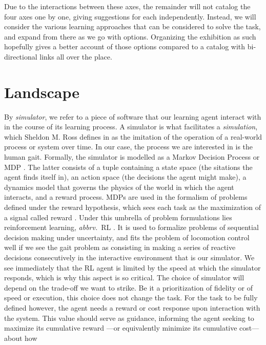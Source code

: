 \documentclass[12pt,a4paper]{article}
\begin{document}
Due to the interactions between these axes, the remainder will not catalog the four axes one by
one, giving suggestions for each independently. Instead, we will consider the various learning
approaches that can be considered to solve the task, and expand from there as we go with options.
Organizing the exhibition as such hopefully gives a better account of those options compared to
a catalog with bi-directional links all over the place.

\section{Landscape}
\label{s:landscape}

By \textit{simulator}, we refer to a piece of software that our learning agent interact with in
the course of its learning process. A simulator is what facilitates a \emph{simulation}, which
Sheldon M. Ross defines in \cite{Ross2022-ra} as the imitation of the operation of a real-world
process or system over time. In our case, the process we are interested in is the human gait.
Formally, the simulator is modelled as a Markov Decision Process or MDP \cite{Puterman1994-pf}.
The latter consists of a tuple containing a state space (the sitations the agent finds itself in),
an action space (the decisions the agent might make), a dynamics model that governs the physics of
the world in which the agent interacts, and a reward process. MDPs are used in the formalism of
problems defined under the reward hypothesis, which sees each task as the maximization of a signal
called reward \cite{Bowling2022-li, Silver2021-uj}. Under this umbrella of problem formulations
lies reinforcement learning, \textit{abbrv.}~RL \cite{Sutton1998-ow}. It is used to
formalize problems of sequential decision making under uncertainty, and fits the problem of
locomotion control well if we see the gait problem as consisting in making a series of reactive
decisions consecutively in the interactive environment that is our simulator. We see immediately
that the RL agent is limited by the speed at which the simulator responds, which is why this
aspect is so critical. The choice of simulator will depend on the trade-off we want to strike.
Be it a prioritization of fidelity or of speed or execution, this choice does not change the task.
For the task to be fully defined however, the agent needs a reward or cost response upon
interaction with the system. This value should serve as guidance, informing the agent seeking
to maximize its cumulative reward ---or equivalently minimize its cumulative cost--- about how
\end{document}
